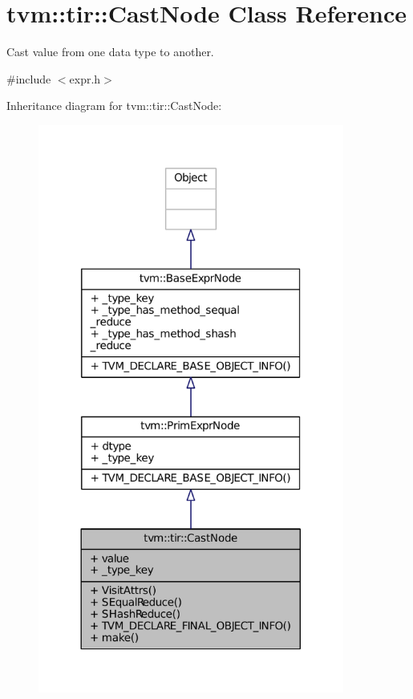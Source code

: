 \hypertarget{classtvm_1_1tir_1_1CastNode}{}\section{tvm\+:\+:tir\+:\+:Cast\+Node Class Reference}
\label{classtvm_1_1tir_1_1CastNode}


Cast value from one data type to another.  




{\ttfamily \#include $<$expr.\+h$>$}



Inheritance diagram for tvm\+:\+:tir\+:\+:Cast\+Node\+:
\nopagebreak
\begin{figure}[H]
\begin{center}
\leavevmode
\includegraphics[width=285pt]{classtvm_1_1tir_1_1CastNode__inherit__graph}
\end{center}
\end{figure}


